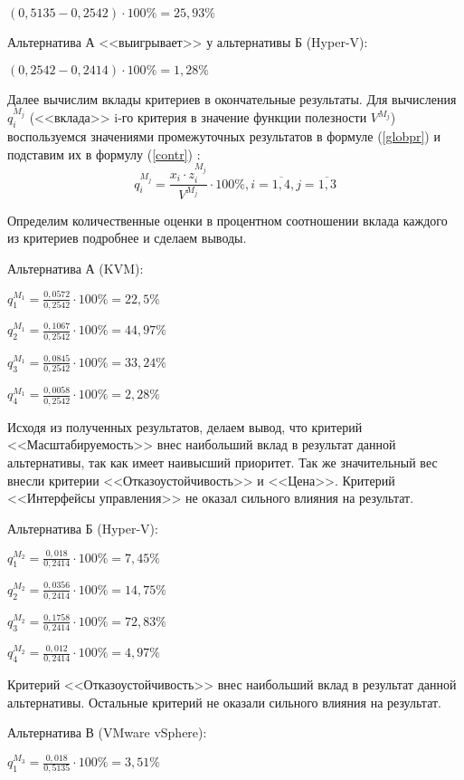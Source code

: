 $(0,5135 - 0,2542) \cdot 100\% = 25,93\%$

Альтернатива А <<выигрывает>> у альтернативы Б (Hyper-V):

$(0,2542 - 0,2414) \cdot 100\% = 1,28\%$

Далее вычислим вклады критериев в окончательные результаты.
Для вычисления $q_{i}^{M_j}$ (<<вклада>> i-го критерия в значение функции полезности $V^{M_j}$) воспользуемся значениями промежуточных результатов в формуле (\ref{globpr}) и подставим их в формулу (\ref{contr}) \cite{var-analyz}:
\begin{equation}\label{contr}
q_{i}^{M_j} = \frac{x_i \cdot z_{i}^{M_j}}{V^{M_j}} \cdot 100\%, i = \overline{1, 4}, j = \overline{1, 3}
\end{equation}

Определим количественные оценки в процентном соотношении вклада каждого из критериев подробнее и сделаем выводы.

Альтернатива А (KVM):

$q_{1}^{M_1} = \frac{0,0572}{0,2542} \cdot 100\% = 22,5\%$

$q_{2}^{M_1} = \frac{0,1067}{0,2542} \cdot 100\% = 44,97\%$

$q_{3}^{M_1} = \frac{0,0845}{0,2542} \cdot 100\% = 33,24\%$

$q_{4}^{M_1} = \frac{0,0058}{0,2542} \cdot 100\% = 2,28\%$

Исходя из полученных результатов, делаем вывод, что критерий <<Масштабируемость>> внес наибольший вклад в результат данной альтернативы, так как имеет наивысший приоритет.
Так же значительный вес внесли критерии <<Отказоустойчивость>> и <<Цена>>.
Критерий <<Интерфейсы управления>> не оказал сильного влияния на результат.

Альтернатива Б (Hyper-V):

$q_{1}^{M_2} = \frac{0,018}{0,2414} \cdot 100\% = 7,45\%$

$q_{2}^{M_2} = \frac{0,0356}{0,2414} \cdot 100\% = 14,75\%$

$q_{3}^{M_2} = \frac{0,1758}{0,2414} \cdot 100\% = 72,83\%$

$q_{4}^{M_2} = \frac{0,012}{0,2414} \cdot 100\% = 4,97\%$

Критерий <<Отказоустойчивость>> внес наибольший вклад в результат данной альтернативы.
Остальные критерий не оказали сильного влияния на результат.

Альтернатива В (VMware vSphere):

$q_{1}^{M_3} = \frac{0,018}{0,5135} \cdot 100\% = 3,51\%$

